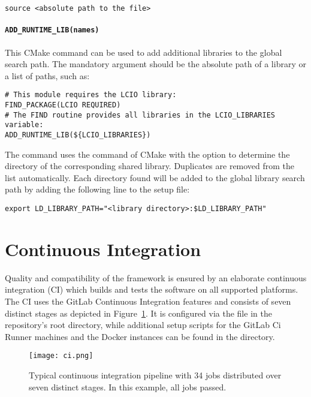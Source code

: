 \begin{verbatim}
source <absolute path to the file>
\end{verbatim}

\paragraph{\texttt{\textbf{ADD\_RUNTIME\_LIB(names)}}}

This CMake command can be used to add additional libraries to the global search path.
The mandatory argument  should be the absolute path of a library or a list of paths, such as:

\begin{verbatim}
# This module requires the LCIO library:
FIND_PACKAGE(LCIO REQUIRED)
# The FIND routine provides all libraries in the LCIO_LIBRARIES variable:
ADD_RUNTIME_LIB(${LCIO_LIBRARIES})
\end{verbatim}

The command uses the  command of CMake with the  option to determine the directory of the corresponding shared library.
Duplicates are removed from the list automatically.
Each directory found will be added to the global library search path by adding the following line to the setup file:

\begin{verbatim}
export LD_LIBRARY_PATH="<library directory>:$LD_LIBRARY_PATH"
\end{verbatim}

\section{Continuous Integration}
\label{sec:ci}

Quality and compatibility of the \apsq framework is ensured by an elaborate continuous integration (CI) which builds and tests the software on all supported platforms.
The \apsq CI uses the GitLab Continuous Integration features and consists of seven distinct stages as depicted in Figure~\ref{fig:ci}.
It is configured via the  file in the repository's root directory, while additional setup scripts for the GitLab Ci Runner machines and the Docker instances can be found in the  directory.

\begin{figure}[btp]
  \centering
  \texttt{[image: ci.png]}
  \caption{Typical \apsq continuous integration pipeline with 34 jobs distributed over seven distinct stages. In this example, all jobs passed.}
  \label{fig:ci}
\end{figure}


